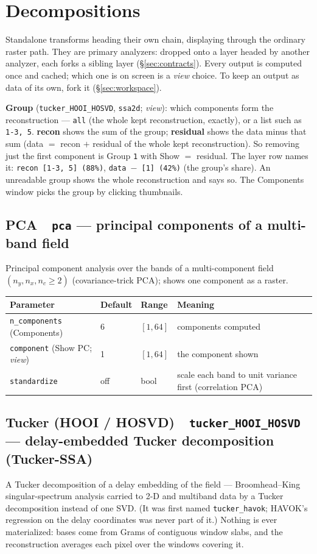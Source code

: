\documentclass[10pt]{article}
\newcommand{\dev}[1]{\texttt{#1}}
\newcommand{\tool}[2]{#1~\textperiodcentered~\dev{#2}}
\begin{document}
\section{Decompositions}
Standalone transforms heading their own chain, displaying through the ordinary raster
path. They are primary analyzers: dropped onto a layer headed by another analyzer, each forks a
sibling layer (\S\ref{sec:contracts}). Every output is computed once and cached; which one is on
screen is a \emph{view} choice. To keep an output as data of its own, fork it (\S\ref{sec:workspace}).

\textbf{Group} (\dev{tucker\_HOOI\_HOSVD}, \dev{ssa2d}; \emph{view}): which components form the
reconstruction --- \texttt{all} (the whole kept reconstruction, exactly), or a list such as
\texttt{1-3, 5}. \textbf{recon} shows the sum of the group; \textbf{residual} shows the data
minus that sum (data $=$ recon $+$ residual of the whole kept reconstruction). So removing
just the first component is Group \texttt{1} with Show $=$ residual. The layer row names it:
\texttt{recon [1-3, 5] (88\%)}, \texttt{data $-$ [1] (42\%)} (the group's share). An
unreadable group shows the whole reconstruction and says so. The Components window picks the
group by clicking thumbnails.

\subsection{\tool{PCA}{pca} --- principal components of a multi-band field}
Principal component analysis over the bands of a multi-component field
$(n_y,n_x,n_c\ge2)$ (covariance-trick PCA); shows one component as a raster.

\begin{longtable}{L l l M}
\toprule Parameter & Default & Range & Meaning \\ \midrule
\texttt{n\_components} (Components) & 6 & $[1,64]$ & components computed \\
\texttt{component} (Show PC; \emph{view}) & 1 & $[1,64]$ & the component shown \\
\texttt{standardize} & off & bool & scale each band to unit variance first (correlation PCA) \\
\bottomrule
\end{longtable}

\subsection{\tool{Tucker (HOOI / HOSVD)}{tucker\_HOOI\_HOSVD} --- delay-embedded Tucker decomposition (Tucker-SSA)}
A Tucker decomposition of a delay embedding of the field --- Broomhead--King singular-spectrum
analysis carried to 2-D and multiband data by a Tucker decomposition instead of one SVD. (It was
first named \dev{tucker\_havok}; HAVOK's regression on the delay coordinates was never part of
it.) Nothing is ever materialized: bases come from Grams of contiguous window slabs, and the
reconstruction averages each pixel over the windows covering it.
\end{document}
